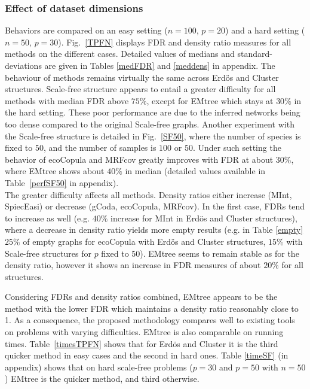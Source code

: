 \subsubsection{Effect of dataset dimensions}
\label{adverse}

Behaviors are compared on an easy setting ($n=100$, $p=20$) and a hard setting ($n=50$, $p=30$). Fig.~\ref{TPFN} displays FDR and density ratio measures for all methods on the different cases.  Detailed values of medians and standard-deviations are given in Tables \ref{medFDR} and \ref{meddens} in appendix. The behaviour of methods remains virtually the same across Erdös and Cluster structures. Scale-free structure appears to entail a greater difficulty for all methods with median FDR above $75\%$, except for EMtree which stays at $30\%$ in the hard setting. These poor performance are due to the inferred networks being too dense compared to the original Scale-free graphs. Another experiment with the Scale-free structure is detailed in Fig.~\ref{SF50}, where the number of species is fixed to $50$, and the number of samples is $100$ or $50$.  Under such setting the behavior of ecoCopula and MRFcov greatly improves with FDR at about $30\%$, where EMtree shows about $40\%$ in median (detailed values available in Table~\ref{perfSF50} in appendix).\\
The greater difficulty affects all methods. Density ratios either increase (MInt, SpiecEasi) or decrease (gCoda, ecoCopula, MRFcov). In the first case, FDRs tend to increase as well (e.g. $40\%$ increase for MInt in Erdös and Cluster structures), where a decrease in density ratio yields more empty results (e.g. in Table \ref{empty} $25\%$ of empty graphs for ecoCopula with  Erdös and Cluster structures, $15\%$ with Scale-free structures for $p$ fixed to $50$). EMtree seems to remain stable as for the density ratio, however it shows an increase in FDR measures of about $20\%$ for all structures.


Considering FDRs and density ratios combined, EMtree appears to be the method with the lower FDR which maintains a density ratio reasonably close to 1. As a consequence, the proposed methodology compares well to existing tools on problems with varying difficulties. EMtree is also comparable on running times. Table~\ref{timesTPFN} shows that for Erdös and Cluster it is the third quicker method in easy cases and the second in hard ones. Table \ref{timeSF} (in appendix) shows that on hard scale-free problems ($p=30$ and $p=50$ with $n=50$) EMtree is the quicker method, and third otherwise.

